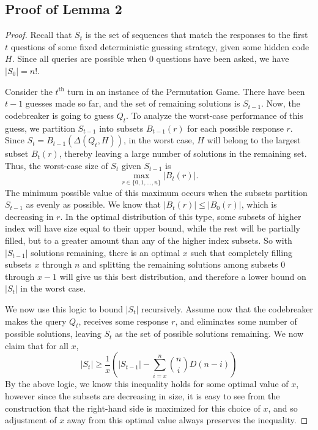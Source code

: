 \documentclass[12pt, a4paper]{article}
\newcommand{\nth}{^{\text{th}}}       %
\begin{document}
		 
		 \subsection{Proof of Lemma 2}
		 \begin{proof}[Proof] 
		 Recall that $S_t$ is the set of sequences that match the responses to the first $t$ questions of some fixed deterministic guessing strategy, given some hidden code $H$. Since all queries are possible when 0 questions have been asked, we have $|S_0| = n!$.
		 
		 Consider the $t\nth$ turn in an instance of the Permutation Game. There have been $t-1$ guesses made so far, and the set of remaining solutions is $S_{t-1}$. Now, the codebreaker is going to guess $Q_t$. To analyze the worst-case performance of this guess, we partition $S_{t-1}$ into subsets $ B_{t-1}(r)$ for each possible response $r$. Since $S_t = B_{t-1}(\Delta(Q_t,H))$, in the worst case, $H$ will belong to the largest subset $B_t(r)$, thereby leaving a large number of solutions in the remaining set. Thus, the worst-case size of $S_t$ given $S_{t-1}$ is
		 \begin{equation*}
			\max_{r\in\{0,1,\ldots,n\}}|B_{t}(r)|.
		 \end{equation*}
		 The minimum possible value of this maximum occurs when the subsets partition $S_{t-1}$ as evenly as possible. We know that $|B_t(r)| \leq |B_0(r)|$, which is decreasing in $r$. In the optimal distribution of this type, some subsets of higher index will have size equal to their upper bound, while the rest will be partially filled, but to a greater amount than any of the higher index subsets. So with $|S_{t-1}|$ solutions remaining, there is an optimal $x$ such that completely filling subsets $x$ through $n$ and splitting the remaining solutions among subsets 0 through $x-1$ will give us this best distribution, and therefore a lower bound on $|S_t|$ in the worst case.
		 
		We now use this logic to bound $|S_t|$ recursively. Assume now that the codebreaker makes the query $Q_t$, receives some response $r$, and eliminates some number of possible solutions, leaving $S_t$ as the set of possible solutions remaining. We now claim that for all $x$,
		\begin{equation}
		|S_t| \ge \frac 1x \left(|S_{t-1}|-\sum_{i = x}^{n}\binom{n}{i}D(n-i)\right)
		\end{equation}
		By the above logic, we know this inequality holds for some optimal value of $x$, however since the subsets are decreasing in size, it is easy to see from the construction that the right-hand side is maximized for this choice of $x$, and so adjustment of $x$ away from this optimal value always preserves the inequality.
		

\end{proof}
\end{document}
